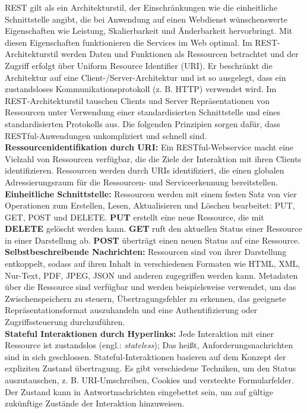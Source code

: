 REST gilt als ein Architekturstil, der Einschränkungen wie die einheitliche Schnittstelle angibt, die bei Anwendung auf einen Webdienst wünschenswerte Eigenschaften wie Leistung, Skalierbarkeit und Änderbarkeit hervorbringt. Mit diesen Eigenschaften funktionieren die Services im Web optimal. Im REST-Architekturstil werden Daten und Funktionen als Ressourcen betrachtet und der Zugriff erfolgt über Uniform Resource Identifier (URI). Er beschränkt die Architektur auf eine Client-/Server-Architektur und ist so ausgelegt, dass ein zustandsloses Kommunikationsprotokoll (z. B. HTTP) verwendet wird. Im REST-Architekturstil tauschen Clients und Server Repräsentationen von Ressourcen unter Verwendung einer standardisierten Schnittstelle und eines standardisierten Protokolls aus. Die folgenden Prinzipien sorgen dafür, dass RESTful-Anwendungen unkompliziert und schnell sind\cite{rws13od}.\\

\textbf{Ressourcenidentifikation durch URI:} Ein RESTful-Webservice macht eine Vielzahl von Ressourcen verfügbar, die die Ziele der Interaktion mit ihren Clients identifizieren. Ressourcen werden durch URIs identifiziert, die einen globalen Adressierungsraum für die Ressourcen- und Serviceerkennung bereitstellen\cite{rws13od}.\\

\textbf{Einheitliche Schnittstelle:} Ressourcen werden mit einem festen Satz von vier Operationen zum Erstellen, Lesen, Aktualisieren und Löschen bearbeitet: PUT, GET, POST und DELETE. \textbf{PUT} erstellt eine neue Ressource, die mit \textbf{DELETE} gelöscht werden kann. \textbf{GET} ruft den aktuellen Status einer Ressource in einer Darstellung ab. \textbf{POST} überträgt einen neuen Status auf eine Ressource\cite{rws13od}.\\

\textbf{Selbstbeschreibende Nachrichten:} Ressourcen sind von ihrer Darstellung entkoppelt, sodass auf ihren Inhalt in verschiedenen Formaten wie HTML, XML, Nur-Text, PDF, JPEG, JSON und anderen zugegriffen werden kann. Metadaten über die Ressource sind verfügbar und werden beispielsweise verwendet, um das Zwischenspeichern zu steuern, Übertragungsfehler zu erkennen, das geeignete Repräsentationsformat auszuhandeln und eine Authentifizierung oder Zugriffssteuerung durchzuführen\cite{rws13od}.\\

\textbf{Stateful Interaktionen durch Hyperlinks:} Jede Interaktion mit einer Ressource ist zustandslos (engl.: \textit{stateless}); Das heißt, Anforderungsnachrichten sind in sich geschlossen. Stateful-Interaktionen basieren auf dem Konzept der expliziten Zustand übertragung. Es gibt verschiedene Techniken, um den Status auszutauschen, z. B. URI-Umschreiben, Cookies und versteckte Formularfelder. Der Zustand kann in Antwortnachrichten eingebettet sein, um auf gültige zukünftige Zustände der Interaktion hinzuweisen\cite{rws13od}.

